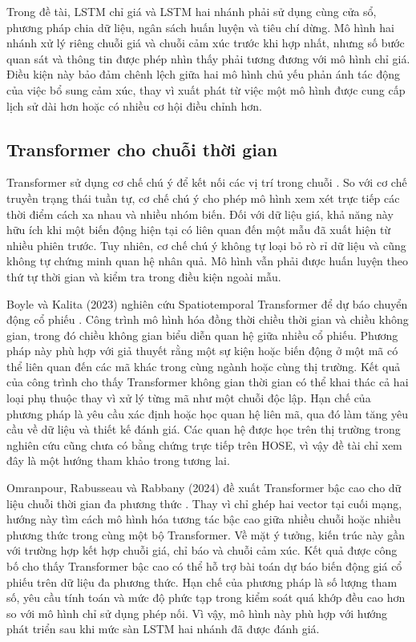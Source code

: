 \documentclass[12pt, a4paper, oneside]{report}
\begin{document}
Trong đề tài, LSTM chỉ giá và LSTM hai nhánh phải sử dụng cùng cửa sổ, phương pháp chia dữ liệu, ngân sách huấn luyện và tiêu chí dừng. Mô hình hai nhánh xử lý riêng chuỗi giá và chuỗi cảm xúc trước khi hợp nhất, nhưng số bước quan sát và thông tin được phép nhìn thấy phải tương đương với mô hình chỉ giá. Điều kiện này bảo đảm chênh lệch giữa hai mô hình chủ yếu phản ánh tác động của việc bổ sung cảm xúc, thay vì xuất phát từ việc một mô hình được cung cấp lịch sử dài hơn hoặc có nhiều cơ hội điều chỉnh hơn.

\subsection{Transformer cho chuỗi thời gian}

Transformer sử dụng cơ chế chú ý để kết nối các vị trí trong chuỗi \cite{Vaswani2017_attention}. So với cơ chế truyền trạng thái tuần tự, cơ chế chú ý cho phép mô hình xem xét trực tiếp các thời điểm cách xa nhau và nhiều nhóm biến. Đối với dữ liệu giá, khả năng này hữu ích khi một biến động hiện tại có liên quan đến một mẫu đã xuất hiện từ nhiều phiên trước. Tuy nhiên, cơ chế chú ý không tự loại bỏ rò rỉ dữ liệu và cũng không tự chứng minh quan hệ nhân quả. Mô hình vẫn phải được huấn luyện theo thứ tự thời gian và kiểm tra trong điều kiện ngoài mẫu.

Boyle và Kalita (2023) nghiên cứu Spatiotemporal Transformer để dự báo chuyển động cổ phiếu \cite{Boyle2023_230503835v1}. Công trình mô hình hóa đồng thời chiều thời gian và chiều không gian, trong đó chiều không gian biểu diễn quan hệ giữa nhiều cổ phiếu. Phương pháp này phù hợp với giả thuyết rằng một sự kiện hoặc biến động ở một mã có thể liên quan đến các mã khác trong cùng ngành hoặc cùng thị trường. Kết quả của công trình cho thấy Transformer không gian thời gian có thể khai thác cả hai loại phụ thuộc thay vì xử lý từng mã như một chuỗi độc lập. Hạn chế của phương pháp là yêu cầu xác định hoặc học quan hệ liên mã, qua đó làm tăng yêu cầu về dữ liệu và thiết kế đánh giá. Các quan hệ được học trên thị trường trong nghiên cứu cũng chưa có bằng chứng trực tiếp trên HOSE, vì vậy đề tài chỉ xem đây là một hướng tham khảo trong tương lai.

Omranpour, Rabusseau và Rabbany (2024) đề xuất Transformer bậc cao cho dữ liệu chuỗi thời gian đa phương thức \cite{Omranpour2024_241210540v1}. Thay vì chỉ ghép hai vector tại cuối mạng, hướng này tìm cách mô hình hóa tương tác bậc cao giữa nhiều chuỗi hoặc nhiều phương thức trong cùng một bộ Transformer. Về mặt ý tưởng, kiến trúc này gần với trường hợp kết hợp chuỗi giá, chỉ báo và chuỗi cảm xúc. Kết quả được công bố cho thấy Transformer bậc cao có thể hỗ trợ bài toán dự báo biến động giá cổ phiếu trên dữ liệu đa phương thức. Hạn chế của phương pháp là số lượng tham số, yêu cầu tính toán và mức độ phức tạp trong kiểm soát quá khớp đều cao hơn so với mô hình chỉ sử dụng phép nối. Vì vậy, mô hình này phù hợp với hướng phát triển sau khi mức sàn LSTM hai nhánh đã được đánh giá.
\end{document}
